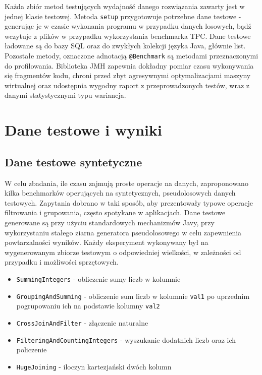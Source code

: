 \documentclass[12pt]{extarticle}
\begin{document}
    Każda zbiór metod testujących wydajność danego rozwiązania zawarty jest w jednej klasie testowej. Metoda \texttt{setup} przygotowuje potrzebne dane testowe - generując je w czasie wykonania programu w przypadku danych losowych, bądź wczytuje z plików w przypadku wykorzystania benchmarka TPC. Dane testowe ładowane są do bazy SQL oraz do zwykłych kolekcji języka Java, głównie list. Pozostałe metody, oznaczone adnotacją \texttt{@Benchmark} są metodami przeznaczonymi do profilowania. Biblioteka JMH zapewnia dokładny pomiar czasu wykonywania się fragmentów kodu, chroni przed zbyt agresywnymi optymalizacjami maszyny wirtualnej oraz udostępnia wygodny raport z przeprowadzonych testów, wraz z danymi statystycznymi typu wariancja.

\section{Dane testowe i wyniki}

\subsection{Dane testowe syntetyczne}

    W celu zbadania, ile czasu zajmują proste operacje na danych, zaproponowano kilka benchmarków operujących na syntetycznych, pseudolosowych danych testowych. Zapytania dobrano w taki sposób, aby prezentowały typowe operacje filtrowania i grupowania, często spotykane w aplikacjach. Dane testowe generowane są przy użyciu standardowych mechanizmów Javy, przy wykorzystaniu stałego ziarna generatora pseudolosowego w celu zapewnienia powtarzalności wyników. Każdy eksperyment wykonywany był na wygenerowanym zbiorze testowym o odpowiedniej wielkości, w zależności od przypadku i możliwości sprzętowych.

\begin{itemize}
    \item \texttt{SummingIntegers} - obliczenie sumy liczb w kolumnie
    \item \texttt{GroupingAndSumming} - obliczenie sum liczb w kolumnie \texttt{val1} po uprzednim pogrupowaniu ich na podstawie kolumny \texttt{val2}
    \item \texttt{CrossJoinAndFilter} - złączenie naturalne
    \item \texttt{FilteringAndCountingIntegers} - wyszukanie dodatnich liczb oraz ich policzenie
    \item \texttt{HugeJoining} - iloczyn kartezjański dwóch kolumn
\end{itemize}
\end{document}
